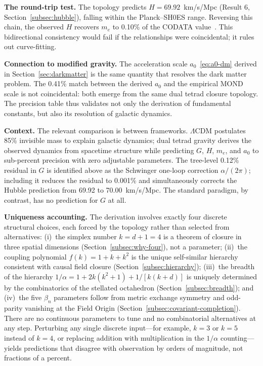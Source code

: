 \documentclass[aps,prd,preprint,superscriptaddress,showpacs,preprintnumbers,amsmath,amssymb,nofootinbib]{revtex4-2}
\begin{document}
\textbf{The round-trip test.} The topology predicts $H = 69.92$~km/s/Mpc (Result 6, Section~\ref{subsec:hubble}), falling within the Planck--SH0ES range. Reversing this chain, the observed $H$ recovers $m_e$ to 0.10\% of the CODATA value~\cite{codata2022}. This bidirectional consistency would fail if the relationships were coincidental; it rules out curve-fitting.

\textbf{Connection to modified gravity.} The acceleration scale $a_0$~\eqref{eq:a0-dm} derived in Section~\ref{sec:darkmatter} is the same quantity that resolves the dark matter problem. The 0.41\% match between the derived $a_0$ and the empirical MOND scale is not coincidental: both emerge from the same dual tetrad closure topology. The precision table thus validates not only the derivation of fundamental constants, but also its resolution of galactic dynamics.

\textbf{Context.} The relevant comparison is between frameworks. $\Lambda$CDM postulates 85\% invisible mass to explain galactic dynamics; dual tetrad gravity derives the observed dynamics from spacetime structure while predicting $G$, $H$, $m_e$, and $a_0$ to sub-percent precision with zero adjustable parameters. The tree-level 0.12\% residual in $G$ is identified above as the Schwinger one-loop correction $\alpha/(2\pi)$; including it reduces the residual to 0.001\% and simultaneously corrects the Hubble prediction from 69.92 to 70.00~km/s/Mpc. The standard paradigm, by contrast, has no prediction for $G$ at all.

\textbf{Uniqueness accounting.} The derivation involves exactly four discrete structural choices, each forced by the topology rather than selected from alternatives: (i)~the simplex number $k = d + 1 = 4$ is a theorem of closure in three spatial dimensions (Section~\ref{subsec:why-four}), not a parameter; (ii)~the coupling polynomial $f(k) = 1 + k + k^2$ is the unique self-similar hierarchy consistent with causal field closure (Section~\ref{subsec:hierarchy}); (iii)~the breadth of the hierarchy $1/\alpha = 1 + 2k(k^2+1) + 1/[k(k+d)]$ is uniquely determined by the combinatorics of the stellated octahedron (Section~\ref{subsec:breadth}); and (iv)~the five $\beta_n$ parameters follow from metric exchange symmetry and odd-parity vanishing at the Field Origin (Section~\ref{subsec:covariant-completion}). There are no continuous parameters to tune and no combinatorial alternatives at any step. Perturbing any single discrete input---for example, $k = 3$ or $k = 5$ instead of $k = 4$, or replacing addition with multiplication in the $1/\alpha$ counting---yields predictions that disagree with observation by orders of magnitude, not fractions of a percent.
\end{document}
